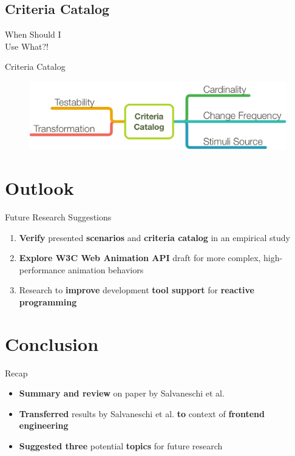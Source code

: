 \documentclass{beamer}
\begin{document}
\subsection*{Criteria Catalog}
\begin{frame}[focus]
	When Should I\\Use What?!
\end{frame}

\begin{frame}[fragile=singleslide]{Criteria Catalog}
	\begin{figure}
		\includegraphics[width=\textwidth]{assets/slides/criteria-catalog.png}
	\end{figure}
\end{frame}

\section{Outlook}
\begin{frame}{Future Research Suggestions}
	\begin{enumerate}
		\item \textbf{Verify} presented \textbf{scenarios} and \textbf{criteria catalog} in an empirical study\bigskip
		\item \textbf{Explore W3C Web Animation API} draft for more complex, high-performance animation behaviors\bigskip
		\item Research to \textbf{improve} development \textbf{tool support} for \textbf{reactive programming}
	\end{enumerate}
\end{frame}


\section{Conclusion}
\begin{frame}{Recap}
	\begin{itemize}
		\item \textbf{Summary and review} on paper by Salvaneschi et al. \cite{7827078}\bigskip
		\item \textbf{Transferred} results by Salvaneschi et al. \textbf{to} context of \textbf{frontend engineering}\bigskip
		\item \textbf{Suggested three} potential \textbf{topics} for future research
	\end{itemize}
\end{frame}
\end{document}
